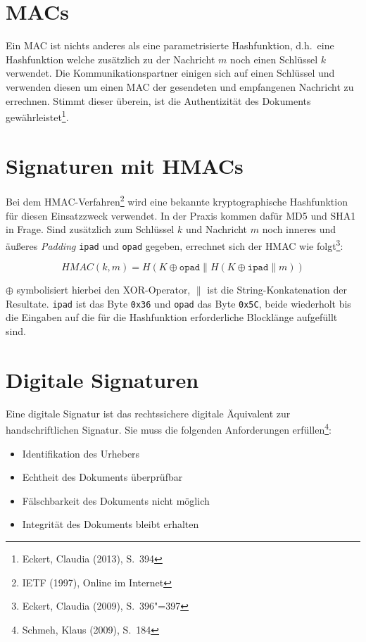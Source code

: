 \section{\ac{MAC}s}

Ein \ac{MAC} ist nichts anderes als eine parametrisierte Hashfunktion,
d.h.~eine Hashfunktion welche zusätzlich zu der Nachricht $m$ noch
einen Schlüssel $k$ verwendet.  Die Kommunikationspartner einigen sich
auf einen Schlüssel und verwenden diesen um einen \ac{MAC} der
gesendeten und empfangenen Nachricht zu errechnen.  Stimmt dieser
überein, ist die Authentizität des Dokuments
gewährleistet\footnote{Eckert, Claudia (2013), S.~394}.

\section{Signaturen mit \ac{HMAC}s}

Bei dem \ac{HMAC}-Verfahren\footnote{IETF (1997), Online im Internet}
wird eine bekannte kryptographische Hashfunktion für diesen
Einsatzzweck verwendet.  In der Praxis kommen dafür MD5 und SHA1 in
Frage.  Sind zusätzlich zum Schlüssel $k$ und Nachricht $m$ noch
inneres und äußeres \emph{Padding} \texttt{ipad} und \texttt{opad}
gegeben, errechnet sich der \ac{HMAC} wie folgt\footnote{Eckert,
  Claudia (2009), S.~396"=397}:

$$HMAC(k, m) = H(K \oplus \texttt{opad} \parallel H(K \oplus \texttt{ipad} \parallel m))$$

$\oplus$ symbolisiert hierbei den XOR-Operator, $\parallel$ ist die
String-Konkatenation der Resultate.  \texttt{ipad} ist das Byte
\texttt{0x36} und \texttt{opad} das Byte \texttt{0x5C}, beide
wiederholt bis die Eingaben auf die für die Hashfunktion erforderliche
Blocklänge aufgefüllt sind.

\section{Digitale Signaturen}

Eine digitale Signatur ist das rechtssichere digitale Äquivalent zur
handschriftlichen Signatur.  Sie muss die folgenden Anforderungen
erfüllen\footnote{Schmeh, Klaus (2009), S.~184}:

\begin{itemize}
\item Identifikation des Urhebers
\item Echtheit des Dokuments überprüfbar
\item Fälschbarkeit des Dokuments nicht möglich
\item Integrität des Dokuments bleibt erhalten
\end{itemize}

